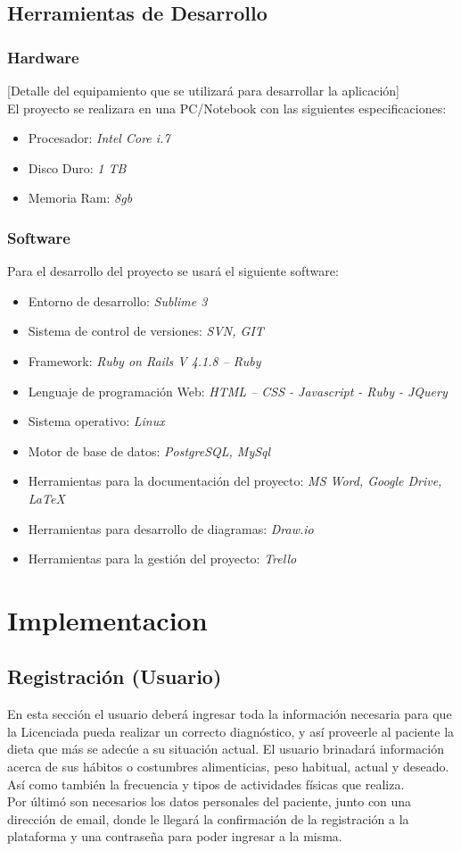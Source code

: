 \documentclass[runningheads,a4paper,spanish]{llncs}
\begin{document}
\subsection{Herramientas de Desarrollo}
\subsubsection{Hardware}
[Detalle del equipamiento que se utilizará para desarrollar la aplicación]\\
El proyecto se realizara en una PC/Notebook con las siguientes especificaciones: 
	\begin{itemize}
		\item Procesador: \textit{Intel Core i.7}
		\item Disco Duro: \textit{1 TB}
		\item Memoria Ram: \textit{8gb}
	\end{itemize}
\subsubsection{Software}
Para el desarrollo del proyecto se usará el siguiente software:
	\begin{itemize}
		\item Entorno de desarrollo: \textit{Sublime 3}
		\item Sistema de control de versiones:\textit{ SVN, GIT}
		\item Framework: \textit{Ruby on Rails V 4.1.8 – Ruby}
		\item Lenguaje de programación Web:\textit{ HTML – CSS - Javascript - Ruby - JQuery}
		\item Sistema operativo: \textit{Linux}
		\item Motor de base de datos: \textit{PostgreSQL, MySql}
		\item Herramientas para la documentación del proyecto:  \textit{MS Word, Google Drive, \LaTeX{}}
		\item	Herramientas para desarrollo de diagramas: \textit{Draw.io}
		\item Herramientas para la gestión del proyecto: \textit{Trello}
	\end{itemize}
	
\section{Implementacion}
\subsection{Registración (Usuario)}
En esta sección el usuario deberá ingresar toda la información necesaria para que la Licenciada pueda realizar un correcto diagnóstico,  y así proveerle al paciente la dieta que más se adecúe a su situación actual. El usuario brinadará información acerca de sus hábitos o costumbres alimenticias, peso habitual, actual y deseado. Así como también la frecuencia y tipos de actividades físicas que realiza.\\
Por últimó son necesarios los datos personales del paciente, junto con una dirección de email, donde le llegará la confirmación de la registración a la plataforma y una contraseña para poder ingresar a la misma.
\end{document}
